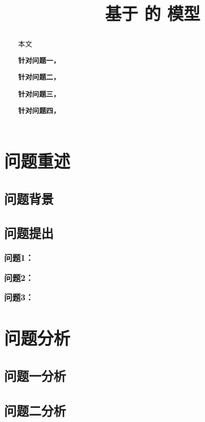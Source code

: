 \documentclass[withoutpreface,bwprint]{cumcmthesis} %
\title{基于 的 模型}
\begin{document}
\maketitle
\nocite{*}


\begin{abstract}
本文

    \textbf{针对问题一，}

    \textbf{针对问题二，}

    \textbf{针对问题三，}

    \textbf{针对问题四，}

\end{abstract}

\section{问题重述}

\subsection{问题背景}


\subsection{问题提出}


\textbf{问题1：}

\textbf{问题2：}

\textbf{问题3：}

\section{问题分析}

\subsection{问题一分析}

\subsection{问题二分析}
\end{document}

